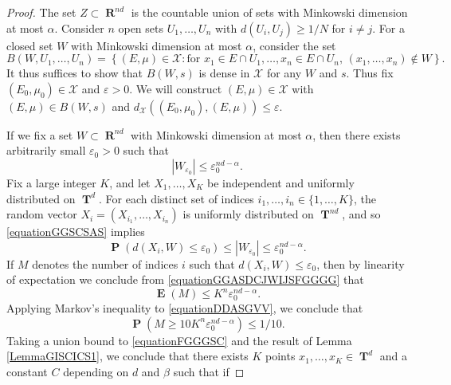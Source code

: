 \documentclass[12pt,reqno]{article}
\numberwithin{equation}{section}
\DeclareMathOperator{\RR}{\mathbf{R}}
\DeclareMathOperator{\TT}{\mathbf{T}}
\DeclareMathOperator{\EE}{\mathbf{E}}
\DeclareMathOperator{\PP}{\mathbf{P}}
\begin{document}
\begin{proof}
    The set $Z \subset \RR^{nd}$ is the countable union of sets with Minkowski dimension at most $\alpha$. Consider $n$ open sets $U_1, \dots, U_n$ with $d(U_i,U_j) \geq 1/N$ for $i \neq j$. For a closed set $W$ with Minkowski dimension at most $\alpha$, consider the set
    \[ B(W,U_1,\dots,U_n) = \left\{ (E,\mu) \in \mathcal{X} : \text{for $x_1 \in E \cap U_1, \dots, x_n \in E \cap U_n$, $(x_1, \dots, x_n) \not \in W$} \right\}. \]
    It thus suffices to show that $B(W,s)$ is dense in $\mathcal{X}$ for any $W$ and $s$. Thus fix $(E_0,\mu_0) \in \mathcal{X}$ and $\varepsilon > 0$. We will construct $(E,\mu) \in \mathcal{X}$ with $(E,\mu) \in B(W,s)$ and $d_{\mathcal{X}}((E_0,\mu_0),(E,\mu)) \leq \varepsilon$.

    If we fix a set $W \subset \RR^{nd}$ with Minkowski dimension at most $\alpha$, then there exists arbitrarily small $\varepsilon_0 > 0$ such that
    \begin{equation} \label{equationGGSCSAS}
        |W_{\varepsilon_0}| \leq \varepsilon_0^{nd - \alpha}.
    \end{equation}
    Fix a large integer $K$, and let $X_1, \dots, X_K$ be independent and uniformly distributed on $\TT^d$. For each distinct set of indices $i_1, \dots, i_n \in \{ 1, \dots, K \}$, the random vector $X_i = (X_{i_1}, \dots, X_{i_n})$ is uniformly distributed on $\TT^{nd}$, and so \eqref{equationGGSCSAS} implies
    \begin{equation} \label{equationGGASDCJWIJSFGGGG}
        \PP(d(X_i,W) \leq \varepsilon_0) \leq |W_{\varepsilon_0}| \leq \varepsilon_0^{nd - \alpha}.
    \end{equation}
    If $M$ denotes the number of indices $i$ such that $d(X_i,W) \leq \varepsilon_0$, then by linearity of expectation we conclude from \eqref{equationGGASDCJWIJSFGGGG} that
    \begin{equation} \label{equationDDASGVV}
        \EE(M) \leq K^n \varepsilon_0^{nd - \alpha}.
    \end{equation}
    Applying Markov's inequality to \eqref{equationDDASGVV}, we conclude that
    \begin{equation} \label{equationFGGGSC}
        \PP(M \geq 10 K^n \varepsilon_0^{nd - \alpha}) \leq 1/10.
    \end{equation}
    Taking a union bound to \eqref{equationFGGGSC} and the result of Lemma \ref{LemmaGISCICS1}, we conclude that there exists $K$ points $x_1, \dots, x_K \in \TT^d$ and a constant $C$ depending on $d$ and $\beta$ such that if

\end{proof}
\end{document}
